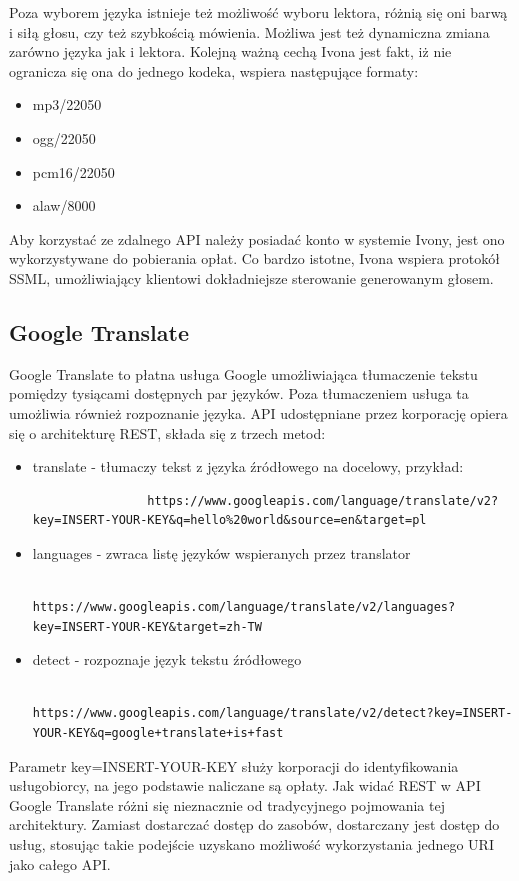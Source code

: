 Poza wyborem języka istnieje też możliwość wyboru lektora, różnią się oni barwą i siłą głosu, czy też szybkością mówienia. Możliwa jest też dynamiczna zmiana zarówno języka jak i lektora. Kolejną ważną cechą Ivona jest fakt, iż nie ogranicza się ona do jednego kodeka, wspiera następujące formaty:
\begin{itemize}
	\item mp3/22050
	\item ogg/22050
	\item pcm16/22050
	\item alaw/8000
\end{itemize}
 Aby korzystać ze zdalnego API należy posiadać konto w systemie Ivony, jest ono wykorzystywane do pobierania opłat. Co bardzo istotne, Ivona wspiera protokół SSML, umożliwiający klientowi dokładniejsze sterowanie generowanym głosem. 

\subsection{Google Translate}
Google Translate to płatna usługa Google umożliwiająca tłumaczenie tekstu pomiędzy tysiącami dostępnych par języków. Poza tłumaczeniem usługa ta umożliwia również rozpoznanie języka. API udostępniane przez korporację opiera się o architekturę REST, składa się z trzech metod:
\begin{itemize}
	\item translate - tłumaczy tekst z języka źródłowego na docelowy, przykład:
			\begin{lstlisting}
				https://www.googleapis.com/language/translate/v2?key=INSERT-YOUR-KEY&q=hello%20world&source=en&target=pl
			\end{lstlisting}
	\item languages - zwraca listę języków wspieranych przez translator
			\begin{lstlisting}
				https://www.googleapis.com/language/translate/v2/languages?key=INSERT-YOUR-KEY&target=zh-TW
			\end{lstlisting}
	\item detect - rozpoznaje język tekstu źródłowego
			\begin{lstlisting}
				https://www.googleapis.com/language/translate/v2/detect?key=INSERT-YOUR-KEY&q=google+translate+is+fast
			\end{lstlisting}
\end{itemize}
Parametr key=INSERT-YOUR-KEY służy korporacji do identyfikowania usługobiorcy, na jego podstawie naliczane są opłaty. Jak widać REST w API Google Translate różni się nieznacznie od tradycyjnego pojmowania tej architektury. Zamiast dostarczać dostęp do zasobów, dostarczany jest dostęp do usług, stosując takie podejście uzyskano możliwość wykorzystania jednego URI jako całego API. 

